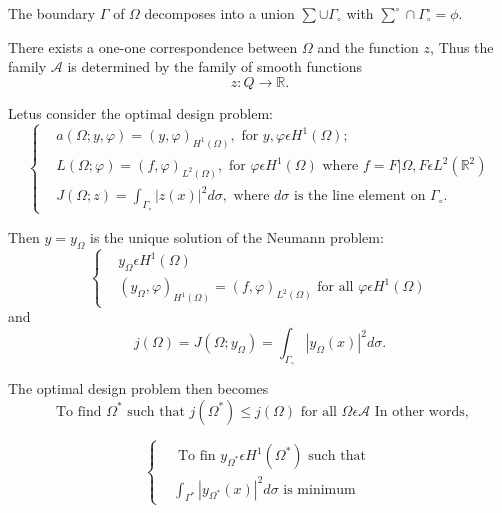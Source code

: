 The boundary $\Gamma$ of $\Omega$ decomposes into a union $\sum \cup
\Gamma_{\circ}$ with $\sum^{\circ} \cap \Gamma_{\circ}^{\circ} =
\phi$. 

There exists a one-one correspondence between $\Omega$ and the
function $z$, Thus the family $\mathscr{A}$ is determined by the family
of smooth functions 
$$
z : Q \to \mathbb{R}.
$$

Let\pageoriginale us consider the optimal design problem:
\begin{equation*}
\begin{cases}
& a(\Omega; y, \varphi) = (y, \varphi)_{H^{1} (\Omega)}, \text{ for } y, \varphi \epsilon H^{1} (\Omega);\\
& L(\Omega ; \varphi) = (f, \varphi)_{L^{2} (\Omega)}, \text{ for } \varphi \epsilon H^{1} (\Omega) \text{ where } f = F | \Omega, F \epsilon L^{2} (\mathbb{R}^{2})\\
& J(\Omega ; z) = \int_{\Gamma_{\circ}} |z(x)|^{2} d\sigma, \text{ where } d\sigma \text{ is the line element on $\Gamma_{\circ}$.}\tag{2.10}\label{chap6-eq2.10}
\end{cases}
\end{equation*}

Then $y = y_{\Omega}$ is the unique solution of the Neumann problem:
\begin{equation*}
\begin{cases}
& y_{\Omega} \epsilon H^{1}(\Omega)\\
& (y_{\Omega}, \varphi)_{H^{1}(\Omega)} = (f, \varphi)_{L^{2} (\Omega)} \text{ for all } \varphi \epsilon H^{1} (\Omega)\tag{2.11}\label{chap6-eq2.11}
\end{cases}
\end{equation*}
and
\begin{equation*}
j(\Omega) = J(\Omega ; y_{\Omega}) = \int_{\Gamma_{\circ}} |y_{\Omega} (x)|^{2} d\sigma.\tag{2.12}\label{chap6-eq2.12}
\end{equation*}

The optimal design problem then becomes
\begin{equation*}
\text{ To find } \Omega^{*} \text{ such that } j(\Omega^{*}) \leq
j(\Omega) \text{ for all } \Omega \epsilon \mathscr{A} \text{ In other
  words,} \tag{2.13}\label{chap6-eq2.13}
\end{equation*}

\begin{equation*}
\begin{cases}
& \text{ To fin } y_{\Omega^{*}} \epsilon H^{1} (\Omega^{*}) \text{ such that }\\
& \int_{\Gamma^{*}} |y_{\Omega^{*}} (x)|^{2} d\sigma \text{ is minimum }\tag*{$(2.13)'$}\label{chap6-eq2.13'}
\end{cases}
\end{equation*}

